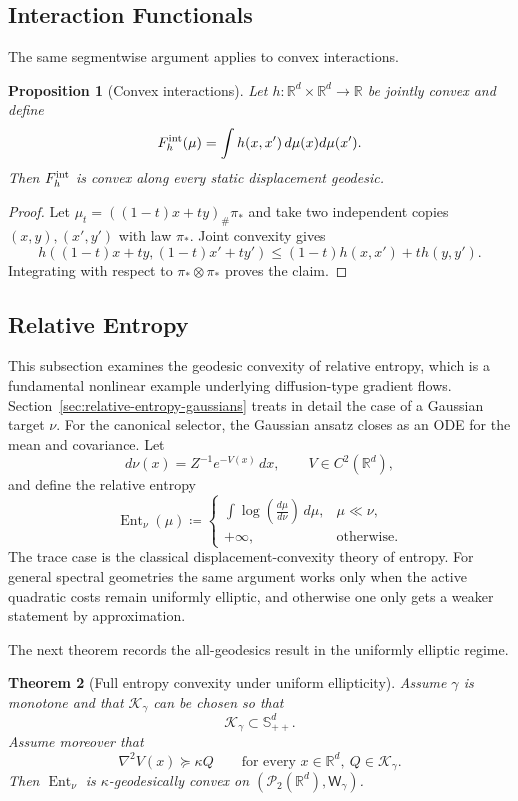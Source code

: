 \documentclass{article}
\newtheorem{theorem}{Theorem}[section]
\newtheorem{proposition}[theorem]{Proposition}
\newcommand{\R}{\mathbb{R}}
\newcommand{\cP}{\mathcal{P}}
\newcommand{\Wg}{\mathsf{W}_{\gamma}}
\newcommand{\cK}{\mathcal K_\gamma}
\newcommand{\Sppd}{\mathbb S_{++}^d}
\begin{document}
\subsection{Interaction Functionals}

The same segmentwise argument applies to convex interactions.
\begin{proposition}[Convex interactions]
Let $h:\R^d\times\R^d\to\R$ be jointly convex and define
\[
 F_h^{\rm int}(\mu)=\int h(x,x')\,d\mu(x)d\mu(x').
\]
Then $F_h^{\rm int}$ is convex along every static displacement geodesic.
\end{proposition}

\begin{proof}
Let $\mu_t=((1-t)x+ty)_\#\pi_*$ and take two independent copies
$(x,y),(x',y')$ with law $\pi_*$. Joint convexity gives
\[
 h((1-t)x+ty,(1-t)x'+ty')
 \le (1-t)h(x,x')+t h(y,y').
\]
Integrating with respect to $\pi_*\otimes\pi_*$ proves the claim.
\end{proof}

\subsection{Relative Entropy}

This subsection examines the geodesic convexity of relative entropy, which is a fundamental nonlinear example underlying diffusion-type gradient flows.
%
Section~\ref{sec:relative-entropy-gaussians} treats in detail the case of a
Gaussian target $\nu$. For the canonical selector, the Gaussian ansatz closes
as an ODE for the mean and covariance.
%
Let
$$
d\nu(x)=Z^{-1}e^{-V(x)}\,dx,
\qquad
V\in C^2(\R^d),
$$
and define the relative entropy
$$
\operatorname{Ent}_\nu(\mu)\coloneqq 
\begin{cases}
\displaystyle \int \log\!\left(\frac{d\mu}{d\nu}\right)\,d\mu, & \mu\ll \nu,\\[0.6em]
+\infty, & \text{otherwise}.
\end{cases}
$$
The trace case is the classical displacement-convexity theory of entropy. For general spectral geometries the same argument works only when the active quadratic costs remain uniformly elliptic, and otherwise one only gets a weaker statement by approximation.

The next theorem records the all-geodesics result in the uniformly elliptic
regime.
\begin{theorem}[Full entropy convexity under uniform ellipticity]
\label{thm:entropyfull}
Assume $\gamma$ is monotone and that $\cK$ can be chosen so that
$$
\cK\subset \Sppd.
$$
Assume moreover that
$$
\nabla^2 V(x)\succeq \kappa Q
\qquad
\text{for every }x\in\R^d,\ Q\in\cK.
$$
Then $\operatorname{Ent}_\nu$ is $\kappa$-geodesically convex on $(\cP_2(\R^d),\Wg)$.
\end{theorem}
\end{document}
